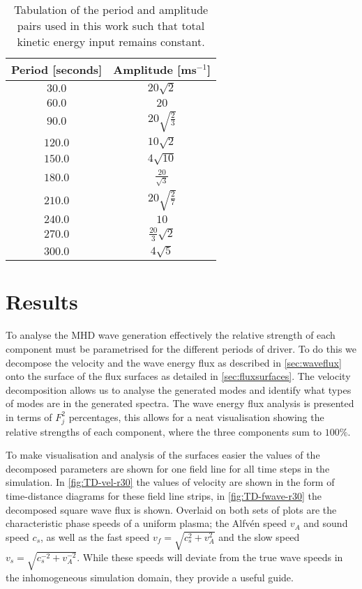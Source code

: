 \begin{table}
    \centering
    \begin{tabular}{cc}
        Period [seconds] & Amplitude [ms$^{-1}$] 	\\ \hline
        $30.0$           & $20\sqrt{2}$           	\\[2ex]
        $60.0$           & $20$  		            \\[2ex]
        $90.0$           & $20\sqrt{\frac{2}{3}}$  \\[2ex]
        $120.0$          & $10\sqrt{2}$        	\\[2ex]
        $150.0$          & $4\sqrt{10}$            \\[2ex]
        $180.0$          & $\frac{20}{\sqrt{3}}$   \\[2ex]
        $210.0$          & $20\sqrt{\frac{2}{7}}$  \\[2ex]
        $240.0$          & $10$                 	\\[2ex]
        $270.0$          & $\frac{20}{3}\sqrt{2}$  \\[2ex]
        $300.0$          & $4\sqrt{5}$           	\\[2ex]
    \end{tabular}
    \caption{Tabulation of the period and amplitude pairs used in this work such that total kinetic energy input remains constant.}
    \label{tab:period-amp}
\end{table}

\section{Results}\label{subsec:results}

To analyse the MHD wave generation effectively the relative strength of each component must be parametrised for the different periods of driver.
To do this we decompose the velocity and the wave energy flux as described in \cref{sec:waveflux} onto the surface of the flux surfaces as detailed in \cref{sec:fluxsurfaces}.
The velocity decomposition allows us to analyse the generated modes and identify what types of modes are in the generated spectra.
The wave energy flux analysis is presented in terms of $F^2_j$ percentages, this allows for a neat visualisation showing the relative strengths of each component, where the three components sum to $100\%$.

To make visualisation and analysis of the surfaces easier the values of the decomposed parameters are shown for one field line for all time steps in the simulation.
In \cref{fig:TD-vel-r30} the values of velocity are shown in the form of time-distance diagrams for these field line strips, in \cref{fig:TD-fwave-r30} the decomposed square wave flux is shown. Overlaid on both sets of plots are the characteristic phase speeds of a uniform plasma; the Alfv\'en speed $v_A$ and sound speed $c_s$, as well as the fast speed $v_f = \sqrt{c_s^2 + v_A^2}$ and the slow speed $v_s = \sqrt{c_s^{-2} + v_A^{-2}}$.
While these speeds will deviate from the true wave speeds in the inhomogeneous simulation domain, they provide a useful guide.

